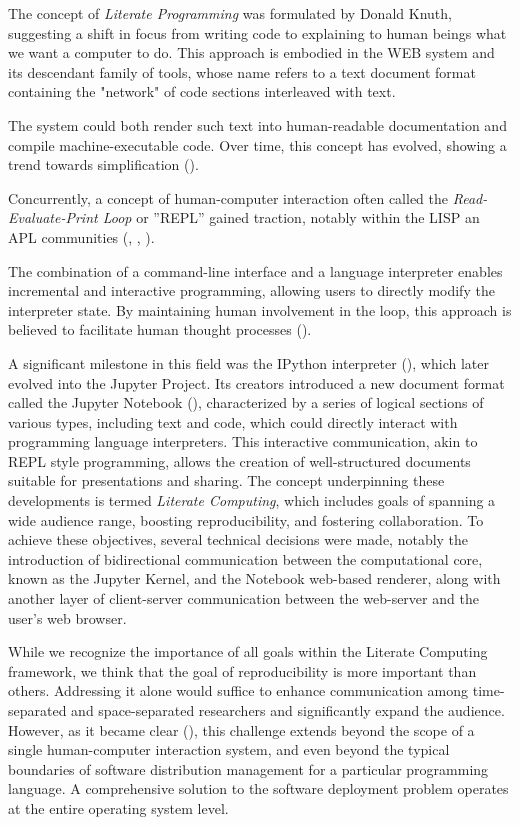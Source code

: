 \documentclass[letterpaper,12pt,twocolumn]{article}
\begin{document}
The concept of \textit{Literate Programming} was formulated by Donald Knuth,
suggesting a shift in focus from writing code to explaining to human beings what
we want a computer to do. This approach is embodied in the WEB
system\cite{Knuth1984lp} and its descendant family of tools, whose name refers
to a text document format containing the "network" of code sections interleaved
with text.

The system could both render such text into human-readable documentation and
compile machine-executable code. Over time, this concept has evolved, showing a
trend towards simplification (\textcite{Ramsey1994lps}).

Concurrently, a concept of human-computer interaction often called the
\textit{Read-Evaluate-Print Loop} or ''REPL'' gained traction, notably within
the LISP an APL communities (\textcite{Spence1975apl},
\textcite{McCarthy1959recfun}, \textcite{Iverson1962apl}).

The combination of a command-line interface and a language interpreter enables
incremental and interactive programming, allowing users to directly modify the
interpreter state. By maintaining human involvement in the loop, this approach
is believed to facilitate human thought processes (\textcite{Granger2021litcomp}).

A significant milestone in this field was the IPython interpreter
(\textcite{Perez2007IPython}), which later evolved into the Jupyter Project. Its
creators introduced a new document format called the Jupyter Notebook
(\textcite{Kluyver2016jupnb}), characterized by a series of logical sections of
various types, including text and code, which could directly interact with
programming language interpreters. This interactive communication, akin to REPL
style programming, allows the creation of well-structured documents suitable for
presentations and sharing. The concept underpinning these developments is termed
\textit{Literate Computing}\cite{Perez2015blog}, which includes goals of
spanning a wide audience range, boosting reproducibility, and fostering
collaboration. To achieve these objectives, several technical decisions were
made, notably the introduction of bidirectional communication between the
computational core, known as the Jupyter Kernel, and the Notebook web-based
renderer, along with another layer of client-server communication between the
web-server and the user’s web browser.

While we recognize the importance of all goals within the Literate Computing
framework, we think that the goal of reproducibility is more important than
others. Addressing it alone would suffice to enhance communication among
time-separated and space-separated researchers and significantly expand the
audience. However, as it became clear (\textcite{Dolstra2010}), this challenge
extends beyond the scope of a single human-computer interaction system, and even
beyond the typical boundaries of software distribution management for a
particular programming language. A comprehensive solution to the software
deployment problem operates at the entire operating system level.
\end{document}
